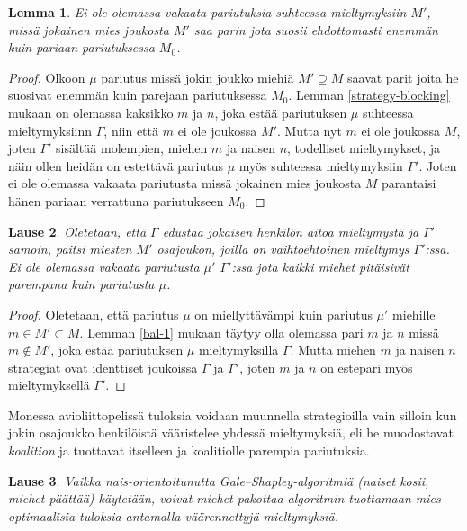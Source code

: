 \documentclass[finnish]{tktltiki2}
\newtheorem{lau}{Lause}
\newtheorem{lem}[lau]{Lemma}
\theoremstyle{definition}
\theoremstyle{remark}
\begin{document}
\begin{lem}\cite[s. 56]{gusfield1989stable}\label{strategy-gus}
	Ei ole olemassa vakaata pariutuksia suhteessa mieltymyksiin $M'$, missä jokainen mies joukosta $M'$ saa parin jota suosii ehdottomasti enemmän kuin pariaan pariutuksessa $M_0$.
\end{lem}

\begin{proof}\cite[s. 56]{gusfield1989stable}
	Olkoon $\mu$ pariutus missä jokin joukko miehiä $M' \supseteq M$ saavat parit joita he suosivat enemmän kuin parejaan pariutuksessa $M_0$. Lemman \ref{strategy-blocking} mukaan on olemassa kaksikko $m$ ja $n$, joka estää pariutuksen $\mu$ suhteessa mieltymyksiinn $\Gamma$, niin että $m$ ei ole joukossa $M'$. Mutta nyt $m$ ei ole joukossa $M$, joten $\Gamma'$ sisältää molempien, miehen $m$ ja naisen $n$, todelliset mieltymykset, ja näin ollen heidän on estettävä pariutus $\mu$ myös suhteessa mieltymyksiin $\Gamma'$. Joten ei ole olemassa vakaata pariutusta missä jokainen mies joukosta $M$ parantaisi hänen pariaan verrattuna pariutukseen $M_0$. 
\end{proof}

\begin{lau}\cite[p, 593]{Balinski}
	Oletetaan, että $\Gamma$ edustaa jokaisen henkilön aitoa mieltymystä ja $\Gamma'$ samoin, paitsi miesten $M'$ osajoukon, joilla on vaihtoehtoinen mieltymys $\Gamma'$:ssa. Ei ole olemassa vakaata pariutusta $\mu'$ $\Gamma'$:ssa jota kaikki miehet pitäisivät parempana kuin pariutusta $\mu$.
\end{lau}
\begin{proof}
	Oletetaan, että pariutus $\mu$ on miellyttävämpi kuin pariutus $\mu'$ miehille $m \in M' \subset M$. Lemman \ref{bal-1} mukaan täytyy olla olemassa pari $m$ ja $n$ missä $m \notin M'$, joka estää pariutuksen $\mu$ mieltymyksillä $\Gamma$. Mutta miehen $m$ ja naisen $n$ strategiat ovat identtiset joukoissa $\Gamma$ ja $\Gamma'$, joten $m$ ja $n$ on estepari myös mieltymyksellä $\Gamma'$.
\end{proof}

Monessa avioliittopelissä tuloksia voidaan muunnella strategioilla vain silloin kun jokin osajoukko henkilöistä vääristelee yhdessä mieltymyksiä, eli he muodostavat \emph{koalition} ja tuottavat itselleen ja koalitiolle parempia pariutuksia.

\begin{lau}\cite[p, 58]{gusfield1989stable}
	Vaikka nais-orientoitunutta Gale--Shapley-algoritmiä (naiset kosii, miehet päättää) käytetään, voivat miehet pakottaa algoritmin tuottamaan mies-optimaalisia tuloksia antamalla väärennettyjä mieltymyksiä.
\end{lau}
\end{document}
